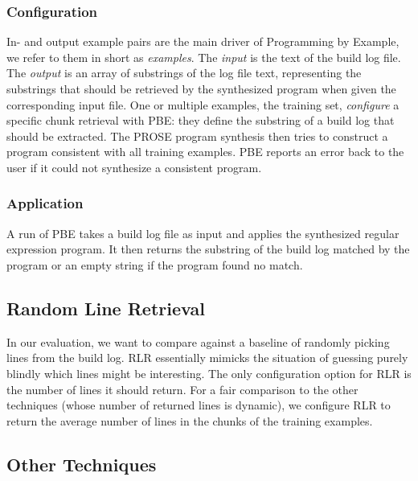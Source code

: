 \subsubsection{Configuration}
In- and output example pairs are the main driver of Programming by
Example, we refer to them in short as \emph{examples}. The
\emph{input} is the text of the build log file. The \emph{output} is
an array of substrings of the log file text, representing the
substrings that should be retrieved by the synthesized program when
given the corresponding input file. One or multiple examples, the
training set, \emph{configure} a specific chunk retrieval with PBE:
they define the substring of a build log that should be extracted. The
PROSE program synthesis then tries to construct a program consistent
with all training examples.
PBE reports an error back to the user if it could not synthesize a
consistent program.


\subsubsection{Application}
A run of PBE takes a build log file as input and applies the
synthesized regular expression program. It then returns the substring
of the build log matched by the program or an empty string if the
program found no match.


\subsection{Random Line Retrieval}
\label{sec:expl-rlr}

In our evaluation, we want to compare against a baseline of randomly
picking lines from the build log. RLR essentially mimicks the
situation of guessing purely blindly which lines might be interesting.
The only configuration option for RLR is the number of lines it should
return. For a fair comparison to the other techniques (whose number of
returned lines is dynamic), we configure RLR to return the average
number of lines in the chunks of the training examples. 

\subsection{Other Techniques}

